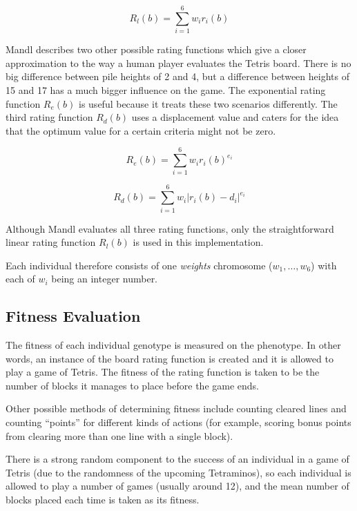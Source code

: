 \documentclass[a4paper,12pt]{article}
\begin{document}
\begin{equation}
  R_l(b) = \sum^6_{i=1} w_ir_i(b)
\end{equation}

Mandl describes two other possible rating functions which give a closer
approximation to the way a human player evaluates the Tetris board.
There is no big difference between pile heights of 2 and 4, but a difference
between heights of 15 and 17 has a much bigger influence on the game.
The exponential rating function $R_e(b)$ is useful because it treats these two
scenarios differently.
The third rating function $R_d(b)$ uses a displacement value and caters for the
idea that the optimum value for a certain criteria might not be zero.

\begin{equation}
\label{ExponentialRating}
  R_e(b) = \sum^6_{i=1} w_ir_i(b)^{e_i}
\end{equation}

\begin{equation}
\label{DisplacementRating}
  R_d(b) = \sum^6_{i=1} w_i \lvert r_i(b) - d_i \rvert ^{e_i}
\end{equation}

Although Mandl evaluates all three rating functions, only the straightforward
linear rating function $R_l(b)$ is used in this implementation.

Each individual therefore consists of one \emph{weights} chromosome
($w_1, \ldots, w_6$) with each of $w_i$ being an integer number.

\subsection{Fitness Evaluation}

The fitness of each individual genotype is measured on the phenotype.
In other words, an instance of the board rating function is created and it is
allowed to play a game of Tetris.
The fitness of the rating function is taken to be the number of blocks it
manages to place before the game ends.

Other possible methods of determining fitness include counting cleared lines
and counting ``points'' for different kinds of actions (for example, scoring
bonus points from clearing more than one line with a single block).

\label{LotsOfGamesEach}
There is a strong random component to the success of an individual in a game of
Tetris (due to the randomness of the upcoming Tetraminos), so each individual
is allowed to play a number of games (usually around 12), and the mean number
of blocks placed each time is taken as its fitness.
\end{document}
